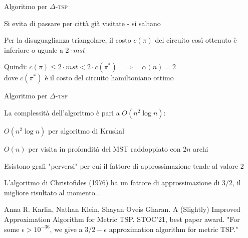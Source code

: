 \begin{frame}{Algoritmo per $\Delta$-\textsc{tsp}}

\vspace{-9pt}
\BIL
\item Si evita di passare per città già visitate - si saltano
\item Per la disuguaglianza triangolare, il costo $c(\pi)$ del circuito così
ottenuto è inferiore o uguale a $2 \cdot \mathit{mst}$
\item Quindi:
$
  c(\pi) \leq 2 \cdot \mathit{mst} < 2 \cdot c(\pi^*) \quad \Rightarrow \quad \alpha(n) = 2
$\\
dove $c(\pi^*)$ è il costo del circuito hamiltoniano ottimo
\EIL

\vspace{-12pt}

\end{frame}

\begin{frame}{Algoritmo per $\Delta$-\textsc{tsp}}

\vspace{-9pt}
\BIL
\item La complessità dell'algoritmo è pari a $O(n^2 \log n)$:
  \BI
  \item $O(n^2 \log n)$ per algoritmo di Kruskal
  \item $O(n)$ per visita in profondità del MST raddoppiato con $2n$ archi
  \EI
\item Esistono grafi "perversi" per cui il fattore di approssimazione tende
al valore $2$
\item L'algoritmo di Christofides (1976) ha un fattore di approssimazione
di $3/2$, il migliore risultato al momento...
\pause
\item Anna R. Karlin, Nathan Klein, Shayan Oveis Gharan. A (Slightly) Improved Approximation Algorithm for Metric TSP. STOC'21, best paper award.
"For some $\epsilon >10^{-36}$, we give a $3/2-\epsilon$ approximation algorithm for metric TSP."
\EIL
  
\end{frame}


